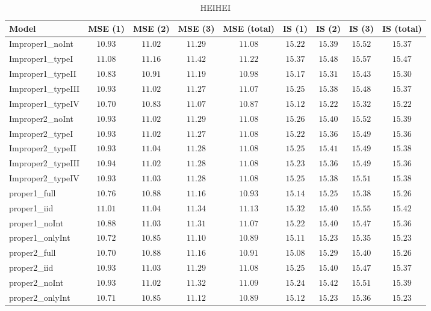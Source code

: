 \begin{table}

\caption{\label{tab:model-choice-sc2}HEIHEI}
\centering
\begin{tabular}{lcccccccc}
\hline
Model  & MSE (1) & MSE (2) & MSE (3) & MSE (total) & IS (1) & IS (2) & IS (3) & \multicolumn{1}{c}{IS (total)} \\ 
\hline
Improper1_noInt  & $10.93$ & $11.02$ & $11.29$ & $11.08$ & $15.22$ & $15.39$ & $15.52$ & $15.37$ \\
Improper1_typeI  & $11.08$ & $11.16$ & $11.42$ & $11.22$ & $15.37$ & $15.48$ & $15.57$ & $15.47$ \\
Improper1_typeII  & $10.83$ & $10.91$ & $11.19$ & $10.98$ & $15.17$ & $15.31$ & $15.43$ & $15.30$ \\
Improper1_typeIII  & $10.93$ & $11.02$ & $11.27$ & $11.07$ & $15.25$ & $15.38$ & $15.48$ & $15.37$ \\
Improper1_typeIV  & $10.70$ & $10.83$ & $11.07$ & $10.87$ & $15.12$ & $15.22$ & $15.32$ & $15.22$ \\
Improper2_noInt  & $10.93$ & $11.02$ & $11.29$ & $11.08$ & $15.26$ & $15.40$ & $15.52$ & $15.39$ \\
Improper2_typeI  & $10.93$ & $11.02$ & $11.27$ & $11.08$ & $15.22$ & $15.36$ & $15.49$ & $15.36$ \\
Improper2_typeII  & $10.93$ & $11.04$ & $11.28$ & $11.08$ & $15.25$ & $15.41$ & $15.49$ & $15.38$ \\
Improper2_typeIII  & $10.94$ & $11.02$ & $11.28$ & $11.08$ & $15.23$ & $15.36$ & $15.49$ & $15.36$ \\
Improper2_typeIV  & $10.93$ & $11.03$ & $11.28$ & $11.08$ & $15.25$ & $15.38$ & $15.51$ & $15.38$ \\
proper1_full  & $10.76$ & $10.88$ & $11.16$ & $10.93$ & $15.14$ & $15.25$ & $15.38$ & $15.26$ \\
proper1_iid  & $11.01$ & $11.04$ & $11.34$ & $11.13$ & $15.32$ & $15.40$ & $15.55$ & $15.42$ \\
proper1_noInt  & $10.88$ & $11.03$ & $11.31$ & $11.07$ & $15.22$ & $15.40$ & $15.47$ & $15.36$ \\
proper1_onlyInt  & $10.72$ & $10.85$ & $11.10$ & $10.89$ & $15.11$ & $15.23$ & $15.35$ & $15.23$ \\
proper2_full  & $10.70$ & $10.88$ & $11.16$ & $10.91$ & $15.08$ & $15.29$ & $15.40$ & $15.26$ \\
proper2_iid  & $10.93$ & $11.03$ & $11.29$ & $11.08$ & $15.25$ & $15.40$ & $15.47$ & $15.37$ \\
proper2_noInt  & $10.93$ & $11.02$ & $11.32$ & $11.09$ & $15.24$ & $15.42$ & $15.51$ & $15.39$ \\
proper2_onlyInt  & $10.71$ & $10.85$ & $11.12$ & $10.89$ & $15.12$ & $15.23$ & $15.36$ & $15.23$ \\
\hline 
\end{tabular}


\end{table}